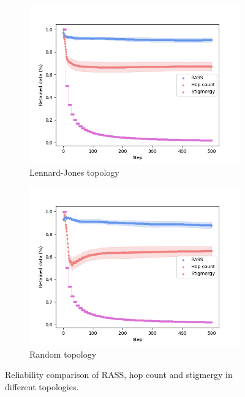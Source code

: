 \begin{figure}
\begin{subfigure}{0.45\textwidth}
        \includegraphics[width=\textwidth]{figures/dora_mesh/lennard_reliability.png}
        \caption{Lennard-Jones topology}
        \label{results:lennard_100_reliability}
    \end{subfigure}
    \begin{subfigure}{0.45\textwidth}
        \includegraphics[width=\textwidth]{figures/dora_mesh/random_reliability.png}
        \caption{Random topology}
        \label{results:random_100_reliability}
    \end{subfigure}
    \caption[RASS reliability]{Reliability comparison of \ac{RASS}, hop count and stigmergy in different topologies.}
    \label{results:rass_reliability}
\end{figure}

